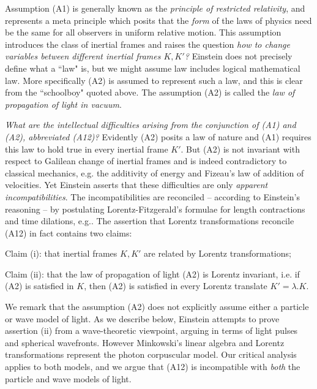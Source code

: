 \documentclass[12pt]{article}
\begin{document}
Assumption (A1) is generally known as the \emph{principle of restricted relativity}, and represents a meta principle which posits that the \emph{form} of the laws of physics need be the same for all observers in uniform relative motion. This assumption introduces the class of inertial frames and raises the question \emph{how to change variables between different inertial frames $K, K'$?} Einstein does not precisely define what a ``law" is, but we might assume law includes logical mathematical law. More specifically (A2) is assumed to represent such a law, and this is clear from the ``schoolboy" quoted above. The assumption (A2) is called the \emph{law of propagation of light in vacuum}. 

\emph{What are the intellectual difficulties arising from the conjunction of (A1) and (A2), abbreviated (A12)?} Evidently (A2) posits a law of nature and (A1) requires this law to hold true in every inertial frame $K'$. But (A2) is not invariant with respect to Galilean change of inertial frames and is indeed contradictory to classical mechanics, e.g. the additivity of energy and Fizeau's law of addition of velocities. Yet Einstein asserts that these difficulties are only \emph{apparent incompatibilities}. The incompatibilities are reconciled -- according to Einstein's reasoning -- by postulating Lorentz-Fitzgerald's formulae for length contractions and time dilations, e.g.\cite[Ch.XIV]{michelson}. The assertion that Lorentz transformations reconcile (A12) in fact contains two claims: 

Claim (i): that inertial frames $K, K'$ are related by Lorentz transformations; 

Claim (ii): that the law of propagation of light (A2) is Lorentz invariant, i.e. if (A2) is satisfied in $K$, then (A2) is satisfied in every Lorentz translate $K'=\lambda.K$.

We remark that the assumption (A2) does not explicitly assume either a particle or wave model of light. As we describe below, Einstein attempts to prove assertion (ii) from a wave-theoretic viewpoint, arguing in terms of light pulses and spherical wavefronts. However Minkowski's linear algebra and Lorentz transformations represent the photon corpuscular model. Our critical analysis applies to both models, and we argue that (A12) is incompatible with \emph{both} the particle and wave models of light.
\end{document}
